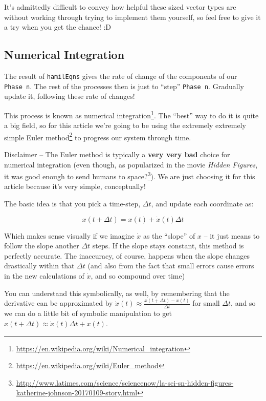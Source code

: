 \documentclass[]{article}
\renewcommand{\href}[2]{#2\footnote{\url{#1}}}
\begin{document}
It's admittedly difficult to convey how helpful these sized vector types are
without working through trying to implement them yourself, so feel free to give
it a try when you get the chance! :D

\hypertarget{numerical-integration}{%
\subsection{Numerical Integration}\label{numerical-integration}}

The result of \texttt{hamilEqns} gives the rate of change of the components of
our \texttt{Phase\ n}. The rest of the processes then is just to ``step''
\texttt{Phase\ n}. Gradually update it, following these rate of changes!

This process is known as
\href{https://en.wikipedia.org/wiki/Numerical_integration}{numerical
integration}. The ``best'' way to do it is quite a big field, so for this
article we're going to be using the extremely extremely simple
\href{https://en.wikipedia.org/wiki/Euler_method}{Euler method} to progress our
system through time.

Disclaimer -- The Euler method is typically a \textbf{very very bad} choice for
numerical integration (even though, as popularized in the movie \emph{Hidden
Figures}, it was good enough to
\href{http://www.latimes.com/science/sciencenow/la-sci-sn-hidden-figures-katherine-johnson-20170109-story.html}{send
humans to space?}). We are just choosing it for this article because it's very
simple, conceptually!

The basic idea is that you pick a time-step, \(\Delta t\), and update each
coordinate as:

\[
x(t + \Delta t) = x(t) + \dot{x}(t) \Delta t
\]

Which makes sense visually if we imagine \(\dot{x}\) as the ``slope'' of \(x\)
-- it just means to follow the slope another \(\Delta t\) steps. If the slope
stays constant, this method is perfectly accurate. The inaccuracy, of course,
happens when the slope changes drastically within that \(\Delta t\) (and also
from the fact that small errors cause errors in the new calculations of
\(\dot{x}\), and so compound over time)

You can understand this symbolically, as well, by remembering that the
derivative can be approximated by
\(\dot{x}(t) \approx \frac{x(t + \Delta t) - x(t)}{\Delta t}\) for small
\(\Delta t\), and so we can do a little bit of symbolic manipulation to get
\(x(t + \Delta t) \approx \dot{x}(t) \Delta t + x(t)\).
\end{document}
